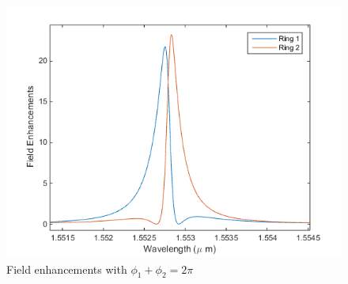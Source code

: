 \begin{figure}
\centering
\includegraphics[width = .8\textwidth]{img/FE_fase_2pi}
\caption{Field enhancements with $\phi_1+\phi_2 = 2\pi$}
\label{FE}
\end{figure}